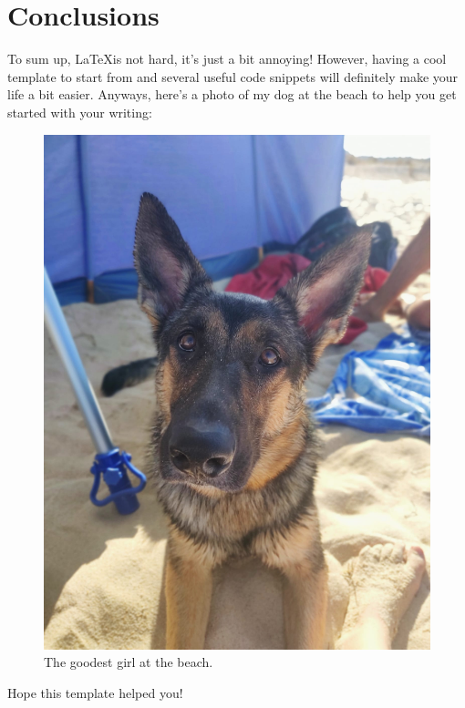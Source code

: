 \chapter{Conclusions}
\label{chapter:conclusions}

To sum up, \LaTeX is not hard, it's just a bit annoying! However, having a cool template to start from and several useful code snippets will definitely make your life a bit easier. Anyways, here's a photo of my dog at the beach to help you get started with your writing:

\begin{figure}[!htb]
	\centering
	\includegraphics[width=.3\textwidth]{images/lira.jpeg}
	\caption{The goodest girl at the beach.}
\end{figure}

Hope this template helped you!
